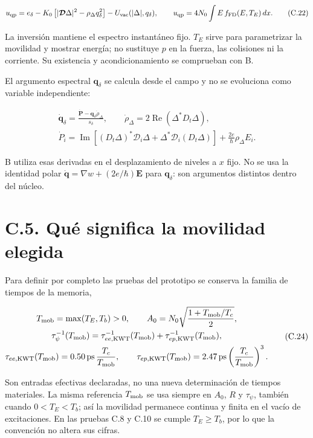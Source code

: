 \documentclass[
  spanish,
  10pt,
  a4paper,
]{article}
\begin{document}
\[
u_{\rm qp}=e_\delta-K_0\left[|\boldsymbol{\mathcal D}\Delta|^2-\rho_\Delta q_\delta^2\right]
-U_{\rm vac}(|\Delta|,q_\delta),\qquad
u_{\rm qp}=4N_0\int E\,f_{\rm FD}(E,T_E)\,dx.
\tag{C.22}
\]

La inversión mantiene el espectro instantáneo fijo. \(T_E\) sirve para
parametrizar la movilidad y mostrar energía; no sustituye \(p\) en la
fuerza, las colisiones ni la corriente. Su existencia y
acondicionamiento se comprueban con B.

El argumento espectral \(\mathbf q_\delta\) se calcula desde el campo y
no se evoluciona como variable independiente:

\[
\begin{gathered}
\dot{\mathbf q}_\delta=\frac{\dot{\mathbf P}-\mathbf q_\delta\dot\rho_\Delta}{s_\delta},
\qquad \dot\rho_\Delta=2\operatorname{Re}(\Delta^*D_t\Delta),\\
\dot P_i=\operatorname{Im}\left[(D_t\Delta)^*\mathcal D_i\Delta
+\Delta^*\mathcal D_i(D_t\Delta)\right]
+\frac{2e}{\hbar}\rho_\Delta E_i.
\end{gathered}\tag{C.23}
\]

B utiliza esas derivadas en el desplazamiento de niveles a \(x\) fijo.
No se usa la identidad polar
\(\dot{\mathbf q}=\nabla w+(2e/\hbar)\mathbf E\) para
\(\mathbf q_\delta\): son argumentos distintos dentro del núcleo.

\section{C.5. Qué significa la movilidad
elegida}\label{c.5.-quuxe9-significa-la-movilidad-elegida}

Para definir por completo las pruebas del prototipo se conserva la
familia de tiempos de la memoria,

\[
\begin{gathered}
T_{\rm mob}=\max(T_E,T_b)>0,\qquad
A_0=N_0\sqrt{\frac{1+T_{\rm mob}/T_c}{2}},\\
\tau_\psi^{-1}(T_{\rm mob})=\tau_{ee,\rm KWT}^{-1}(T_{\rm mob})+\tau_{ep,\rm KWT}^{-1}(T_{\rm mob}),\\
\tau_{ee,\rm KWT}(T_{\rm mob})=0.50\,{\rm ps}\,\frac{T_c}{T_{\rm mob}},\qquad
\tau_{ep,\rm KWT}(T_{\rm mob})=2.47\,{\rm ps}\left(\frac{T_c}{T_{\rm mob}}\right)^3.
\end{gathered}\tag{C.24}
\]

Son entradas efectivas declaradas, no una nueva determinación de tiempos
materiales. La misma referencia \(T_{\rm mob}\) se usa siempre en
\(A_0\), \(R\) y \(\tau_\psi\), también cuando \(0<T_E<T_b\); así la
movilidad permanece continua y finita en el vacío de excitaciones. En
las pruebas C.8 y C.10 se cumple \(T_E\geq T_b\), por lo que la
convención no altera sus cifras.
\end{document}

